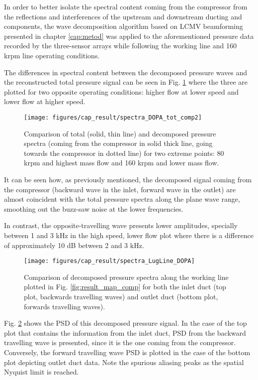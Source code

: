 In order to better isolate the spectral content coming from the compressor from the reflections and interferences of the upstream and downstream ducting and components, the wave decomposition algorithm based on LCMV beamforming presented in chapter \ref{cap:metod} was applied to the aforementioned pressure data recorded by the three-sensor arrays while following the working line and 160 krpm line operating conditions.

The differences in spectral content between the decomposed pressure waves and the reconstructed total pressure signal can be seen in Fig. \ref{fig:result_spectra_DOPA_tot_comp} where the three are plotted for two opposite operating conditions: higher flow at lower speed and lower flow at higher speed.

\begin{figure}[b!]
\centering
\texttt{[image: figures/cap\_result/spectra\_DOPA\_tot\_comp2]}
\caption[Comparison of total and decomposed spectra]{Comparison of total (solid, thin line) and decomposed pressure spectra (coming from the compressor in solid thick line, going towards the compressor in dotted line) for two extreme points: 80 krpm and highest mass flow and 160 krpm and lower mass flow.}
\label{fig:result_spectra_DOPA_tot_comp}
\end{figure}

It can be seen how, as previously mentioned, the decomposed signal coming from the compressor (backward wave in the inlet, forward wave in the outlet) are almost coincident with the total pressure spectra along the plane wave range, smoothing out the buzz-saw noise at the lower frequencies. 

In contrast, the opposite-travelling wave presents lower amplitudes, specially between 1 and 3 kHz in the high speed, lower flow plot where there is a difference of approximately 10 dB between 2 and 3 kHz.

\begin{figure}[tbh!]
\centering
\texttt{[image: figures/cap\_result/spectra\_LugLine\_DOPA]}
\caption[Decomposed plane wave spectra along the working line]{Comparison of decomposed pressure spectra along the working line plotted in Fig. \ref{fig:result_map_comp} for both the inlet duct (top plot, backwards travelling waves) and outlet duct (bottom plot, forwards travelling waves).}
\label{fig:result_spectra_LugLine_DOPA}
\end{figure}

Fig. \ref{fig:result_spectra_LugLine_DOPA} shows the PSD of this decomposed pressure signal. In the case of the top plot that contains the information from the inlet duct, PSD from the backward travelling wave is presented, since it is the one coming from the compressor. Conversely, the forward travelling wave PSD is plotted in the case of the bottom plot depicting outlet duct data. Note the spurious aliasing peaks as the spatial Nyquist limit is reached.

